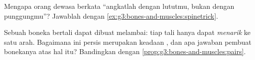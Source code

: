 \begin{exercise}[$\star\star$]\label{exo:g3:bones-and-muscles:9}
Mengapa orang dewasa berkata ``angkatlah dengan lututmu, bukan dengan
punggungmu''? Jawablah dengan
\cref{ex:g3:bones-and-muscles:spinetrick}.
\end{exercise}

\begin{exercise}[$\star\star$]\label{exo:g3:bones-and-muscles:10}
Sebuah boneka bertali dapat dibuat melambai: tiap tali hanya dapat
\emph{menarik}  ke satu arah. Bagaimana ini persis merupakan
keadaan , dan apa jawaban pembuat bonekanya atas hal itu?
Bandingkan dengan \cref{prop:g3:bones-and-muscles:pairs}.
\end{exercise}
